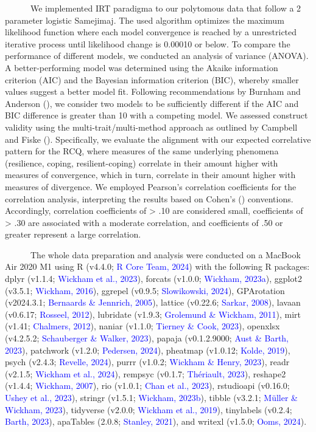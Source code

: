 \documentclass[
  man,floatsintext]{apa7}
\begin{document}
~~~~~~We implemented IRT paradigma to our polytomous data that follow a 2 parameter logistic Samejimaj. The used algorithm optimizes the maximum likelihood function where each model convergence is reached by a unrestricted iterative process until likelihood change is 0.00010 or below. To compare the performance of different models, we conducted an analysis of variance (ANOVA). A better-performing model was determined using the Akaike information criterion (AIC) and the Bayesian information criterion (BIC), whereby smaller values suggest a better model fit. Following recommendations by Burnham and Anderson (), we consider two models to be sufficiently different if the AIC and BIC difference is greater than 10 with a competing model. We assessed construct validity using the multi-trait/multi-method approach as outlined by Campbell and Fiske (). Specifically, we evaluate the alignment with our expected correlative pattern for the RCQ, where measures of the same underlying phenomena (resilience, coping, resilient-coping) correlate in their amount higher with measures of convergence, which in turn, correlate in their amount higher with measures of divergence. We employed Pearson's correlation coefficients for the correlation analysis, interpreting the results based on Cohen's () conventions. Accordingly, correlation coefficients of \textgreater{} .10 are considered small, coefficients of \textgreater{} .30 are associated with a moderate correlation, and coefficients of .50 or greater represent a large correlation.

~~~~~~The whole data preparation and analysis were conducted on a MacBook Air 2020 M1 using R (v4.4.0; \textcolor{blue}{R Core Team, 2024}) with the following R packages: dplyr (v1.1.4; \textcolor{blue}{Wickham et al., 2023}), forcats (v1.0.0; \textcolor{blue}{Wickham, 2023a}), ggplot2 (v3.5.1; \textcolor{blue}{Wickham, 2016}), ggrepel (v0.9.5; \textcolor{blue}{Slowikowski, 2024}), GPArotation (v2024.3.1; \textcolor{blue}{Bernaards \& Jennrich, 2005}), lattice (v0.22.6; \textcolor{blue}{Sarkar, 2008}), lavaan (v0.6.17; \textcolor{blue}{Rosseel, 2012}), lubridate (v1.9.3; \textcolor{blue}{Grolemund \& Wickham, 2011}), mirt (v1.41; \textcolor{blue}{Chalmers, 2012}), naniar (v1.1.0; \textcolor{blue}{Tierney \& Cook, 2023}), openxlsx (v4.2.5.2; \textcolor{blue}{Schauberger \& Walker, 2023}), papaja (v0.1.2.9000; \textcolor{blue}{Aust \& Barth, 2023}), patchwork (v1.2.0; \textcolor{blue}{Pedersen, 2024}), pheatmap (v1.0.12; \textcolor{blue}{Kolde, 2019}), psych (v2.4.3; \textcolor{blue}{Revelle, 2024}), purrr (v1.0.2; \textcolor{blue}{Wickham \& Henry, 2023}), readr (v2.1.5; \textcolor{blue}{Wickham et al., 2024}), rempsyc (v0.1.7; \textcolor{blue}{Thériault, 2023}), reshape2 (v1.4.4; \textcolor{blue}{Wickham, 2007}), rio (v1.0.1; \textcolor{blue}{Chan et al., 2023}), rstudioapi (v0.16.0; \textcolor{blue}{Ushey et al., 2023}), stringr (v1.5.1; \textcolor{blue}{Wickham, 2023b}), tibble (v3.2.1; \textcolor{blue}{Müller \& Wickham, 2023}), tidyverse (v2.0.0; \textcolor{blue}{Wickham et al., 2019}), tinylabels (v0.2.4; \textcolor{blue}{Barth, 2023}), apaTables (2.0.8; \textcolor{blue}{Stanley, 2021}), and writexl (v1.5.0; \textcolor{blue}{Ooms, 2024}).
\end{document}
